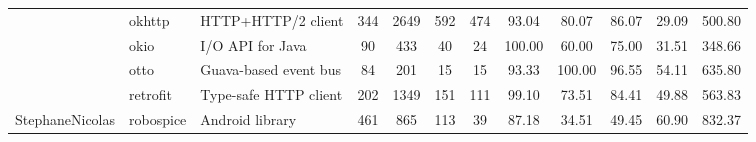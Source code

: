\begin{table*}[]
{\begin{tabular}{lllccccccccc}
                            & okhttp                                                        & HTTP+HTTP/2 client                                                       & 344            & 2649            & 592                                                              & 474            & 93.04          & 80.07          & 86.07          & 29.09                                                                                 & 500.80                                               \\
                            & okio                                                          & I/O API for Java                                                         & 90             & 433             & 40                                                               & 24             & 100.00         & 60.00          & 75.00          & 31.51                                                                                 & 348.66                                               \\
                            & otto                                                          & Guava-based event bus                                                    & 84             & 201             & 15                                                               & 15             & 93.33          & 100.00         & 96.55          & 54.11                                                                                 & 635.80                                               \\
                            & retrofit                                                      & Type-safe HTTP client                                                    & 202            & 1349            & 151                                                              & 111            & 99.10          & 73.51          & 84.41          & 49.88                                                                                 & 563.83                                               \\ \hline
StephaneNicolas             & robospice                                                     & Android library                                                          & 461            & 865             & 113                                                              & 39             & 87.18          & 34.51          & 49.45          & 60.90                                                                                 & 832.37                                               \\ \hline

\end{tabular}}
\end{table*}
